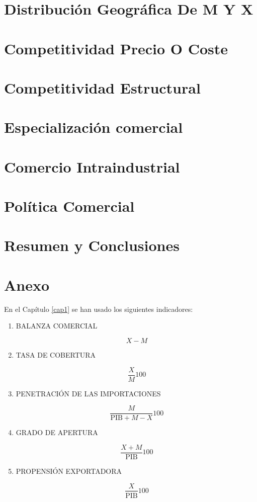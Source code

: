 \documentclass[a4paper,openright,12pt]{book}
\begin{document}
\chapter{Distribución Geográfica De M Y X}
\label{cap3}




\chapter{Competitividad Precio O Coste}
\label{cap4}

\chapter{Competitividad Estructural}
\label{cap5}

\chapter{Especialización comercial}

\chapter{Comercio Intraindustrial}

\chapter{Política Comercial}

\chapter{Resumen y Conclusiones}

\chapter{Anexo}

En el Capítulo \ref{cap1} se han usado los siguientes indicadores:

\begin{enumerate}

    \item BALANZA COMERCIAL

    $$X - M$$
    \item TASA DE COBERTURA

    $$\frac{X}{M}100$$
    \item PENETRACIÓN DE LAS IMPORTACIONES

    $$\frac{M}{\text{PIB} + M - X} 100$$
    \item GRADO DE APERTURA

    $$\frac{X+M}{\text{PIB}} 100$$
    \item PROPENSIÓN EXPORTADORA

    $$\frac{X}{\text{PIB}} 100$$

\end{enumerate}
\end{document}

